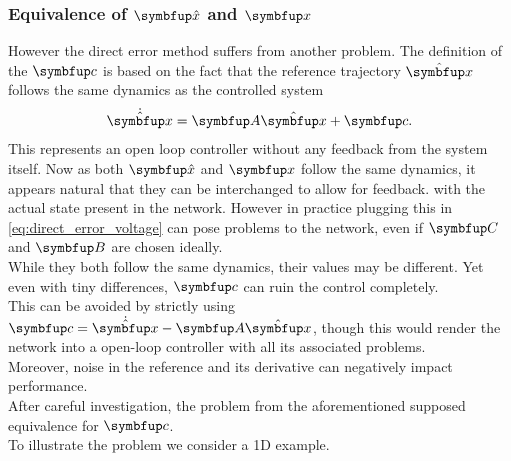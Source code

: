 \subsubsection{Equivalence of $\bmu{\hat{x}}$ and $\bmu{x}$}
However the direct error method suffers from another problem. The definition of the $\bmu{c}$ is based on the fact that the reference trajectory $\hat{\bmu{x}}$ follows the same dynamics as the controlled system
\begin{equation}
	\dot{\hat{\bmu{x}}} = \bmu{A}\hat{\bmu{x}} + \bmu{c}.
\end{equation}
This represents an open loop controller without any feedback from the system itself.
Now as both $\bmu{\hat{x}}$ and $\bmu{x}$ follow the same dynamics, it appears natural that they can be interchanged to allow for feedback. with the actual state present in the network. However in practice plugging this in \cref{eq:direct_error_voltage} can pose problems to the network, even if $\bmu{C}$ and $\bmu{B}$ are chosen ideally.\\
While they both follow the same dynamics, their values may be different. Yet even with tiny differences, $\bmu{c}$ can ruin the control completely.\\

This can be avoided by strictly using $\bmu{c} = \dot{\hat{\bmu{x}}} -\bmu{A}\hat{\bmu{x}}$, though this would render the network into a open-loop controller with all its associated problems.\\
Moreover, noise in the reference and its derivative can negatively impact performance.\\
After careful investigation, the problem from the aforementioned supposed equivalence for $\bmu{c}$.\\
To illustrate the problem we consider a 1D example.
